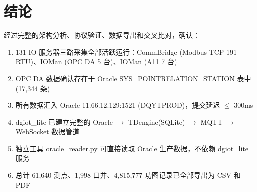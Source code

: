 \documentclass[12pt,a4paper]{ctexart}
\begin{document}
\section{结论}

经过完整的架构分析、协议验证、数据导出和交叉比对，确认：

\begin{enumerate}[leftmargin=*]
  \item 131 IO 服务器三路采集全部活跃运行：CommBridge (Modbus TCP 191 RTU)、IOMan (OPC DA 5 台)、IOMan (A11 7 台)
  \item OPC DA 数据确认存在于 Oracle SYS\_POINTRELATION\_STATION 表中 (17,344 条)
  \item 所有数据汇入 Oracle 11.66.12.129:1521 (DQYTPROD)，提交延迟 $\leq$ 300ms
  \item dgiot\_lite 已建立完整的 Oracle $\rightarrow$ TDengine(SQLite) $\rightarrow$ MQTT $\rightarrow$ WebSocket 数据管道
  \item 独立工具 oracle\_reader.py 可直接读取 Oracle 生产数据，不依赖 dgiot\_lite 服务
  \item 总计 61,640 测点、1,998 口井、4,815,777 功图记录已全部导出为 CSV 和 PDF
\end{enumerate}
\end{document}
